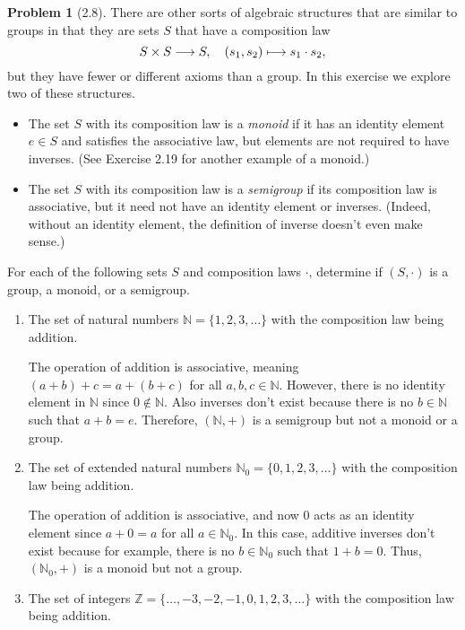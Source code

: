 \documentclass[12pt]{article}
\theoremstyle{definition}
\newtheorem{problem}{Problem}
\begin{document}
\begin{problem}[2.8]
    There are other sorts of algebraic structures that are similar to groups in that they are sets $S$ that have a composition law
    \[S \times S \longrightarrow S, \hspace{10px} (s_1, s_2) \longmapsto s_1 \cdot s_2,\]
    but they have fewer or different axioms than a group. In this exercise we explore two of these structures.
    \begin{itemize}
        \item The set $S$ with its composition law is a \textit{monoid} if it has an identity element $e \in S$ and satisfies the associative law,
              but elements are not required to have inverses. (See Exercise 2.19 for another example of a monoid.)
        \item The set $S$ with its composition law is a \textit{semigroup} if its composition law is associative, but it need not have an identity
              element or inverses. (Indeed, without an identity element, the definition of inverse doesn't even make sense.)
    \end{itemize}
    For each of the following sets $S$ and composition laws $\cdot$, determine if $(S, \cdot)$ is a group, a monoid, or a semigroup.
    \begin{enumerate}[label=(\alph*)]
        \item The set of natural numbers $\mathbb{N} = \{1, 2, 3, \ldots\}$ with the composition law being addition.
        
        \begin{solution}
        The operation of addition is associative, meaning $(a + b) + c = a + (b + c)$ for all $a, b, c \in \mathbb{N}$. However, there is no identity element in $\mathbb{N}$ since $0 \notin \mathbb{N}$. Also inverses don't exist because there is no $b \in \mathbb{N}$ such that $a + b = e$. Therefore, $(\mathbb{N}, +)$ is a semigroup but not a monoid or a group.
        \end{solution}
        \item The set of extended natural numbers $\mathbb{N}_0 = \{0, 1, 2, 3, \ldots\}$ with the composition law being addition.
        
        \begin{solution}
            The operation of addition is associative, and now $0$ acts as an identity element since $a + 0 = a$ for all $a \in \mathbb{N}_0$. In this case, additive inverses don't exist because for example, there is no $b \in \mathbb{N}_0$ such that $1 + b = 0$. Thus, $(\mathbb{N}_0, +)$ is a monoid but not a group.
        \end{solution}
        \item The set of integers $\mathbb{Z} = \{\ldots, -3, -2, -1, 0, 1, 2, 3, \ldots\}$ with the composition law being addition.
        

\end{enumerate}
\end{problem}
\end{document}
